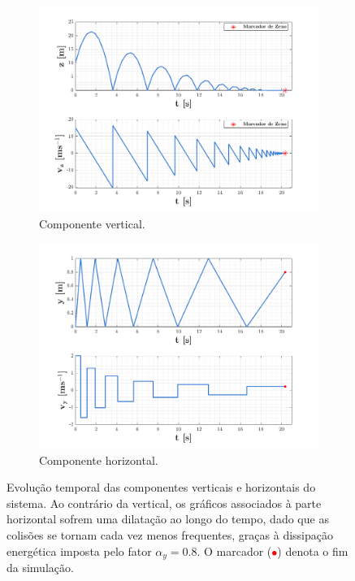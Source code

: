 \vspace{-1em}
\begin{figure}[H]
    \begin{subfigure}[b]{0.5\linewidth}
        \centering
        \includegraphics[width=1\linewidth]{img/P4/P4-z}
        \caption{Componente vertical.} 
        \label{fig:P4-z} 
    \end{subfigure}%
    \begin{subfigure}[b]{0.5\linewidth}
        \centering
        \includegraphics[width=1\linewidth]{img/P4/P4-y}
        \caption{Componente horizontal.} 
        \label{fig:P4-y} 
    \end{subfigure}%
    \caption{Evolução temporal das componentes verticais e horizontais do sistema. Ao contrário da vertical, os gráficos associados à parte horizontal sofrem uma dilatação ao longo do tempo, dado que as colisões se tornam cada vez menos frequentes, graças à dissipação energética imposta pelo fator $\alpha_y = 0.8$. O marcador (\textcolor{red}{$\bullet$}) denota o fim da simulação.}
    \label{fig:P4-z-y}
\end{figure}

